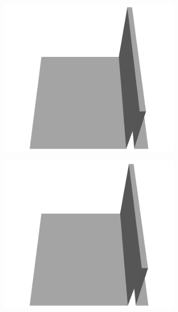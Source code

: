 \documentclass[../document.tex]{subfiles}
\begin{document}
\begin{figure}[H]
\begin{subfigure}[b]{0.065\textwidth}
    \includegraphics[width=\linewidth]{../img/5/custom_patches/walls_front/all/19-3d.png}
    \end{subfigure}
    \begin{subfigure}[b]{0.065\textwidth}
    \includegraphics[width=\linewidth]{../img/5/custom_patches/walls_front/all/18-3d.png}
    \end{subfigure}
    \begin{subfigure}[b]{0.065\textwidth}

\end{subfigure}
\end{figure}
\end{document}
